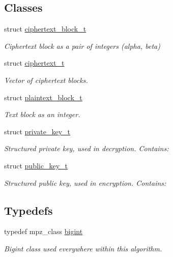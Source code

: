 \subsection*{Classes}
\begin{DoxyCompactItemize}
\item 
struct \mbox{\hyperlink{structelGamal_1_1ciphertext__block__t}{ciphertext\+\_\+block\+\_\+t}}
\begin{DoxyCompactList}\small\item\em Ciphertext block as a pair of integers (alpha, beta) \end{DoxyCompactList}\item 
struct \mbox{\hyperlink{structelGamal_1_1ciphertext__t}{ciphertext\+\_\+t}}
\begin{DoxyCompactList}\small\item\em Vector of ciphertext blocks. \end{DoxyCompactList}\item 
struct \mbox{\hyperlink{structelGamal_1_1plaintext__block__t}{plaintext\+\_\+block\+\_\+t}}
\begin{DoxyCompactList}\small\item\em Text block as an integer. \end{DoxyCompactList}\item 
struct \mbox{\hyperlink{structelGamal_1_1private__key__t}{private\+\_\+key\+\_\+t}}
\begin{DoxyCompactList}\small\item\em Structured private key, used in decryption. Contains\+: \end{DoxyCompactList}\item 
struct \mbox{\hyperlink{structelGamal_1_1public__key__t}{public\+\_\+key\+\_\+t}}
\begin{DoxyCompactList}\small\item\em Structured public key, used in encryption. Contains\+: \end{DoxyCompactList}\end{DoxyCompactItemize}
\subsection*{Typedefs}
\begin{DoxyCompactItemize}
\item 
typedef mpz\+\_\+class \mbox{\hyperlink{namespaceelGamal_ab2883bf41ce8d738e2428c8ae81b0245}{bigint}}
\begin{DoxyCompactList}\small\item\em Bigint class used everywhere within this algorithm. \end{DoxyCompactList}\end{DoxyCompactItemize}
